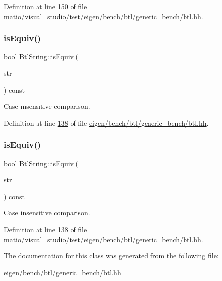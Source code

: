 Definition at line \hyperlink{matio_2visual__studio_2test_2eigen_2bench_2btl_2generic__bench_2btl_8hh_source_l00150}{150} of file \hyperlink{matio_2visual__studio_2test_2eigen_2bench_2btl_2generic__bench_2btl_8hh_source}{matio/visual\+\_\+studio/test/eigen/bench/btl/generic\+\_\+bench/btl.\+hh}.

\mbox{\label{class_btl_string_afdc2da5f185fa7585b1363b2dd6b36cb}} 
\subsubsection{\texorpdfstring{is\+Equiv()}{isEquiv()}\hspace{0.1cm}{\footnotesize\ttfamily [1/2]}}
{\footnotesize\ttfamily bool Btl\+String\+::is\+Equiv (\begin{DoxyParamCaption}\item[{const \hyperlink{class_btl_string}{Btl\+String} \&}]{str }\end{DoxyParamCaption}) const\hspace{0.3cm}{\ttfamily [inline]}}

Case insensitive comparison. 

Definition at line \hyperlink{eigen_2bench_2btl_2generic__bench_2btl_8hh_source_l00138}{138} of file \hyperlink{eigen_2bench_2btl_2generic__bench_2btl_8hh_source}{eigen/bench/btl/generic\+\_\+bench/btl.\+hh}.

\mbox{\label{class_btl_string_afdc2da5f185fa7585b1363b2dd6b36cb}} 
\subsubsection{\texorpdfstring{is\+Equiv()}{isEquiv()}\hspace{0.1cm}{\footnotesize\ttfamily [2/2]}}
{\footnotesize\ttfamily bool Btl\+String\+::is\+Equiv (\begin{DoxyParamCaption}\item[{const \hyperlink{class_btl_string}{Btl\+String} \&}]{str }\end{DoxyParamCaption}) const\hspace{0.3cm}{\ttfamily [inline]}}

Case insensitive comparison. 

Definition at line \hyperlink{matio_2visual__studio_2test_2eigen_2bench_2btl_2generic__bench_2btl_8hh_source_l00138}{138} of file \hyperlink{matio_2visual__studio_2test_2eigen_2bench_2btl_2generic__bench_2btl_8hh_source}{matio/visual\+\_\+studio/test/eigen/bench/btl/generic\+\_\+bench/btl.\+hh}.



The documentation for this class was generated from the following file\+:\begin{DoxyCompactItemize}
\item 
eigen/bench/btl/generic\+\_\+bench/btl.\+hh\end{DoxyCompactItemize}
